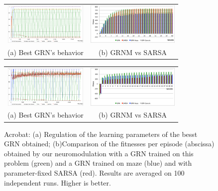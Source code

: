 \begin{figure}[b!]
\center
\begin{minipage}[t!]{0.49\linewidth}
\center
\setlength{\tabcolsep}{0.5mm}
\begin{tabular}{cc}
\includegraphics[height=2cm]{PW_GRNBehavior.pdf} &
\includegraphics[height=2cm]{PW_GRNvsSARSA.pdf} \\
(a) Best GRN's behavior &
(b) GRNM vs SARSA
\end{tabular}
\caption{Puddle world: (b) Comparison of the fitnesses per episode (abscissa) obtained by our neuromodulation with a GRN trained on this problem (green), a GRN trained on maze (blue), a GRN trained on maze and mountain car (gray) and with parameter-fixed SARSA (red). Results are averaged on 100 independent runs. Higher is better.}\label{fig:PW:Results}
\end{minipage}
\hspace{1.5mm}
\begin{minipage}[t!]{0.49\linewidth}
\center
\setlength{\tabcolsep}{0.5mm}
\begin{tabular}{cc}
\includegraphics[height=2cm]{ACP_GRNBehavior.pdf} &
\includegraphics[height=2cm]{ACP_GRNvsSARSA.pdf} \\
(a) Best GRN's behavior &
(b) GRNM vs SARSA
\end{tabular}
\caption{Acrobat: (a) Regulation of the learning parameters of the besst GRN obtained; (b)Comparison of the fitnesses per episode (abscissa) obtained by our neuromodulation with a GRN trained on this problem (green) and a GRN trained on maze (blue) and with parameter-fixed SARSA (red). Results are averaged on 100 independent runs. Higher is better. }\label{fig:ACP:Results}
\end{minipage}
\end{figure}

